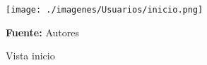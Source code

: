 \begin{figure}[!htb]
  \begin{center}
\texttt{[image: ./imagenes/Usuarios/inicio.png]}
    \caption{Vista inicio}
    \label{fig:Vista_inicio}
    \textbf{Fuente:}  Autores
  \end{center}
\end{figure}

